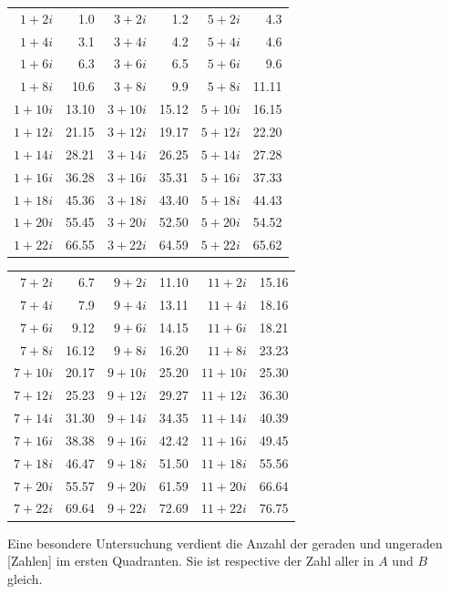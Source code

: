 \begin{center}
\begin{tabular}{r|r||r|r||r|r||}
$1+2i$&1.0&$3+2i$&1.2&$5+2i$&4.3\\
$1+4i$&3.1&$3+4i$&4.2&$5+4i$&4.6\\
$1+6i$&6.3&$3+6i$&6.5&$5+6i$&9.6\\
$1+8i$&10.6&$3+8i$&9.9&$5+8i$&11.11\\
$1+10i$&13.10&$3+10i$&15.12&$5+10i$&16.15\\
$1+12i$&21.15&$3+12i$&19.17&$5+12i$&22.20\\
$1+14i$&28.21&$3+14i$&26.25&$5+14i$&27.28\\
$1+16i$&36.28&$3+16i$&35.31&$5+16i$&37.33\\
$1+18i$&45.36&$3+18i$&43.40&$5+18i$&44.43\\
$1+20i$&55.45&$3+20i$&52.50&$5+20i$&54.52\\
$1+22i$&66.55&$3+22i$&64.59&$5+22i$&65.62
\end{tabular}
\par\medskip
\begin{tabular}{r|r||r|r||r|r}
$7+2i$&6.7&$9+2i$&11.10&$11+2i$&15.16\\
$7+4i$&7.9&$9+4i$&13.11&$11+4i$&18.16\\
$7+6i$&9.12&$9+6i$&14.15&$11+6i$&18.21\\
$7+8i$&16.12&$9+8i$&16.20&$11+8i$&23.23\\
$7+10i$&20.17&$9+10i$&25.20&$11+10i$&25.30\\
$7+12i$&25.23&$9+12i$&29.27&$11+12i$&36.30\\
$7+14i$&31.30&$9+14i$&34.35&$11+14i$&40.39\\
$7+16i$&38.38&$9+16i$&42.42&$11+16i$&49.45\\
$7+18i$&46.47&$9+18i$&51.50&$11+18i$&55.56\\
$7+20i$&55.57&$9+20i$&61.59&$11+20i$&66.64\\
$7+22i$&69.64&$9+22i$&72.69&$11+22i$&76.75
\end{tabular}
\end{center}\endgroup
\par\indent Eine besondere Untersuchung verdient die Anzahl der geraden und ungeraden [Zahlen] im ersten Quadranten. Sie ist respective der Zahl aller in $A$ und $B$ gleich.
\clearpage

